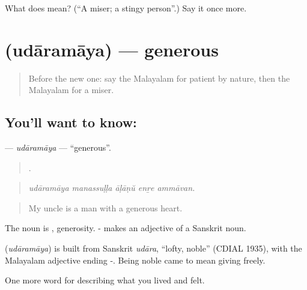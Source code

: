 \begin{tcolorbox}[breakable,colback=teal!4,colframe=teal!35!black,title={Before you move on}]
What does  mean? (\textquotedblleft{}A miser; a stingy person\textquotedblright{}.) Say it once more.
\end{tcolorbox}
\section[\texorpdfstring{\ml{ഉദാരമായ} (udāramāya)}{ഉദാരമായ (udāramāya)}]{ (udāramāya) — generous}

\label{lesson:ML-C527-udaramaya}



\begin{quote}
Before the new one: say the Malayalam for patient by nature, then the Malayalam for a miser.
\end{quote}

\subsection*{You'll want to know: }
\textbf{} — \emph{udāramāya} — \textquotedblleft{}generous\textquotedblright{}.

\begin{quote}
    .
\end{quote}

\begin{quote}
\emph{udāramāya manassuḷḷa āḷāṇŭ enṟe ammāvan.}
\end{quote}

\begin{quote}
My uncle is a man with a generous heart.
\end{quote}

The noun is , generosity. - makes an adjective of a Sanskrit noun.

\begin{cousinweb}
\textbf{} (\emph{udāramāya}) is built from Sanskrit \emph{udāra}, \textquotedblleft{}lofty, noble\textquotedblright{} (CDIAL 1935), with the Malayalam adjective ending -. Being noble came to mean giving freely.
\end{cousinweb}

\begin{grammarlens}[title={What you've built}]
One more word for describing what you lived and felt.
\end{grammarlens}

